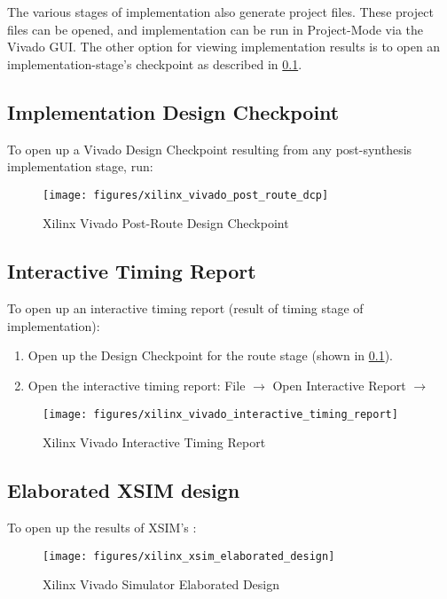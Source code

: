 \begin{flushleft}
The various stages of implementation also generate project files. These project files can be opened, and implementation can be run in Project-Mode via the Vivado GUI. The other option for viewing implementation results is to open an implementation-stage's checkpoint as described in \ref{dcp}.

\subsection{Implementation Design Checkpoint}
\label{dcp}
To open up a Vivado Design Checkpoint resulting from any post-synthesis implementation stage, run:\newline
{}\newline
\begin{figure}[H]
	\centerline{\texttt{[image: figures/xilinx\_vivado\_post\_route\_dcp]}}
	\caption{Xilinx Vivado Post-Route Design Checkpoint}
\end{figure}

\subsection{Interactive Timing Report}
To open up an interactive timing report (result of timing stage of implementation):
\begin{enumerate}
\item Open up the Design Checkpoint for the route stage (shown in \ref{dcp}).
\item Open the interactive timing report:
\subitem File $\rightarrow$ Open Interactive Report $\rightarrow$ 
\end{enumerate}
\begin{figure}[H]
	\centerline{\texttt{[image: figures/xilinx\_vivado\_interactive\_timing\_report]}}
	\caption{Xilinx Vivado Interactive Timing Report}
\end{figure}

\subsection{Elaborated XSIM design}
To open up the results of XSIM's :\newline
{}\newline
\begin{figure}[H]
	\centerline{\texttt{[image: figures/xilinx\_xsim\_elaborated\_design]}}
	\caption{Xilinx Vivado Simulator Elaborated Design}
\end{figure}


\end{flushleft}
